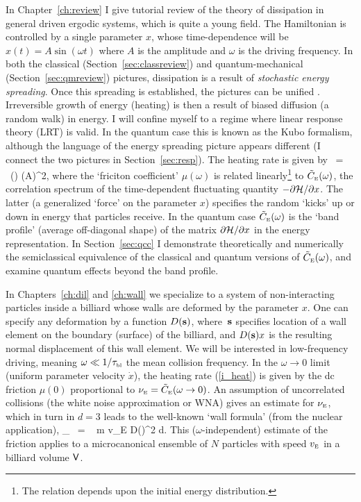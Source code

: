 In Chapter~\ref{ch:review} I give tutorial review of the
theory of dissipation in general driven
ergodic systems, which is quite a young field.
The Hamiltonian is controlled by a single parameter $x$, whose
time-dependence will be $x(t)=A\sin(\omega t)$ where $A$ is the amplitude  
and $\omega$ is the driving frequency.
In both the classical (Section~\ref{sec:classreview}) and quantum-mechanical
(Section~\ref{sec:qmreview}) pictures, dissipation is a result of
{\em stochastic energy spreading}.
Once this spreading is established, the pictures can be unified \cite{doronfrc}.
Irreversible growth of energy (heating) is then a result of biased diffusion
(a random walk) in energy.
I will confine myself to a regime where linear response theory (LRT) is valid.
In the quantum case this is known as the Kubo formalism, although the
language of the energy spreading picture appears different (I connect the
two pictures in Section~\ref{sec:resp}).
The heating rate is given by
\be
\label{i_heat}
	 \rangle \ = \
	\mu(\omega) \cdot \half  (A\omega)^2,
\ee
where the `friciton coefficient' $\mu(\omega)$ is related
linearly\footnote{The relation depends upon the initial energy distribution.}
to $\cew$, the correlation spectrum
of the time-dependent fluctuating quantity
$-\partial {\cal H}/\partial x$.
The latter (a generalized `force' on the parameter $x$) specifies the
random `kicks' up or down in energy that particles receive.
In the quantum case $\cew$ is the `band profile' (average off-diagonal shape)
of the matrix $\partial {\cal H}/\partial x$ in the energy representation.
In Section~\ref{sec:qcc} I demonstrate theoretically and numerically the
semiclassical equivalence of the classical and quantum versions of $\cew$,
and examine quantum effects beyond the band profile.


In Chapters~\ref{ch:dil} and \ref{ch:wall} we specialize to a
system of non-interacting particles
inside a billiard whose walls are deformed by the parameter $x$.
One can specify any deformation by a function $D(\mbf{s})$,
where~$\mbf{s}$ specifies location of a wall element
on the boundary (surface) of the billiard,
and $D(\mbf{s})x$ is the resulting normal displacement of this
wall element.
We will be interested in low-frequency driving, 
meaning $\omega \ll 1/\tbl$ the mean collision frequency.
In the $\omega\rightarrow0$ limit (uniform parameter velocity $\dot{x}$),
the heating rate (\ref{i_heat}) is given by the dc friction
$\mu(0)$ proportional to
$\ve = \tilde{C}_{\tbox E}(\omega\rightarrow0)$.
An assumption of uncorrelated collisions
(the white noise approximation or WNA)
gives an estimate for $\ve$, which in turn in $d=3$
leads to the well-known
`wall formula' \cite{wall} (from the nuclear application),
\be
        \mu_{} \  = \  
        m v_{\tbox E} \oint D()^2 d\mbf{s}.
\ee
This ($\omega$-independent) estimate of the friction applies to
a microcanonical ensemble of $N$ particles
with speed $v_{\tbox E}$ in a billiard volume $\mV$.

